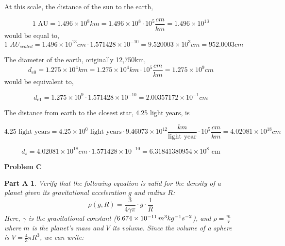 \documentclass{article}
\theoremstyle{plain}
\begin{document}
\begin{enumerate}
{\begin{center}
          \end{center}
          At this scale, the distance of the sun to the earth, \begin{center}
              \[
                  \text{1 AU} = 1.496 \times 10^{8} km = 1.496 \times 10^{8}\cdot10^{5}\frac{cm}{km} = 1.496 \times 10^{13}
              \]
              would be equal to,
              \[
                  \text{1 }AU_{scaled} =  1.496 \times 10^{13}cm \cdot 1.571428 \times 10^{-10} = 9.520003\times10^{3}cm = 952.0003cm
              \]
          \end{center}
          \newpage
          The diameter of the earth, originally 12,750km, \[d_{e0} = 1.275\times10^{4}km = 1.275\times10^{4}km\cdot10^{5}\frac{cm}{km} = 1.275\times10^{9}cm\]
          would be equivalent to,
          \begin{center}
              \[
                  d_{e1} = 1.275 \times 10^{9} \cdot 1.571428 \times 10^{-10} = 2.00357172 \times 10^{-1}cm
              \]
          \end{center}}
          The distance from earth to the closest star, 4.25 light years, is
          \begin{center}
              \[
                  4.25 \text{ light years} = 4.25 \times 10^{0} \text{ light years} \cdot 9.46073 \times 10^{12} \frac{km}{\text{light year}} \cdot 10^{5}\frac{cm}{km} = 4.02081 \times 10^{18} cm
              \]

              \[
                  d_{s} = 4.02081 \times 10^{18} cm \cdot 1.571428 \times 10^{-10} = 6.31841380954 \times 10^{8} \text{ cm}
              \]
          \end{center}
    \item[\textbf{Problem C}]{
          \newtheorem*{problem}{Part A}
          \begin{problem}
          Verify that the following equation is valid for the density of a planet given its gravitational acceleration \(g\) and radius \(R\):
          \begin{equation}
              \rho(g, R) = \frac{3}{4 \gamma \pi} \cdot g \cdot \frac{1}{R}
          \end{equation}
          Here, \(\gamma\) is the gravitational constant ($6.674 \times 10^{-11} \mskip\thinmuskip m^3kg^{-1}s^{-2}$), and \(\rho = \frac{m}{V}\) where \(m\) is the planet's mass and \(V\) its volume. Since the volume of a sphere is \(V = \frac{4}{3}\pi R^3\), we can write:


\end{problem}}
\end{enumerate}
\end{document}
